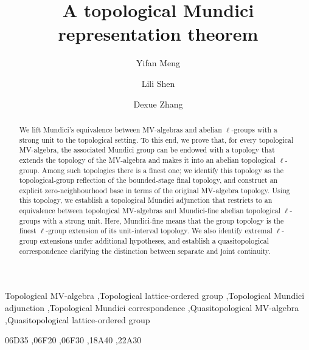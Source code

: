 \documentclass[preprint,3p]{elsarticle}
\theoremstyle{plain}
\theoremstyle{definition}
\numberwithin{equation}{section}
\begin{document}
\begin{frontmatter}

\title{A topological Mundici representation theorem}

\author{Yifan Meng}

\author{Lili Shen}

\author{Dexue Zhang}

\address{School of Mathematics, Sichuan University, Chengdu 610064, China}

\begin{abstract}
We lift Mundici's equivalence between MV-algebras and abelian
$\ell$-groups with a strong unit to the topological setting.
To this end, we prove that, for every topological MV-algebra,
the associated Mundici group can be endowed with a topology that
extends the topology of the MV-algebra and makes it into an abelian
topological $\ell$-group.
Among such topologies there is a finest one;
we identify this topology as the topological-group reflection of
the bounded-stage final topology, and construct an explicit
zero-neighbourhood base in terms of the original MV-algebra topology.
Using this topology, we establish a topological Mundici adjunction
that restricts to an equivalence between topological MV-algebras and
Mundici-fine abelian topological $\ell$-groups with a strong unit.
Here, Mundici-fine means that the group topology is the finest
$\ell$-group extension of its unit-interval topology.
We also identify extremal $\ell$-group extensions under additional
hypotheses, and establish a quasitopological correspondence clarifying
the distinction between separate and joint continuity.
\end{abstract}

\begin{keyword}
Topological MV-algebra \sep Topological lattice-ordered group
\sep Topological Mundici adjunction \sep Topological Mundici correspondence
\sep Quasitopological MV-algebra \sep Quasitopological lattice-ordered group

\MSC[2020] 06D35 \sep 06F20 \sep 06F30 \sep 18A40 \sep 22A30
\end{keyword}

\end{frontmatter}
\end{document}
